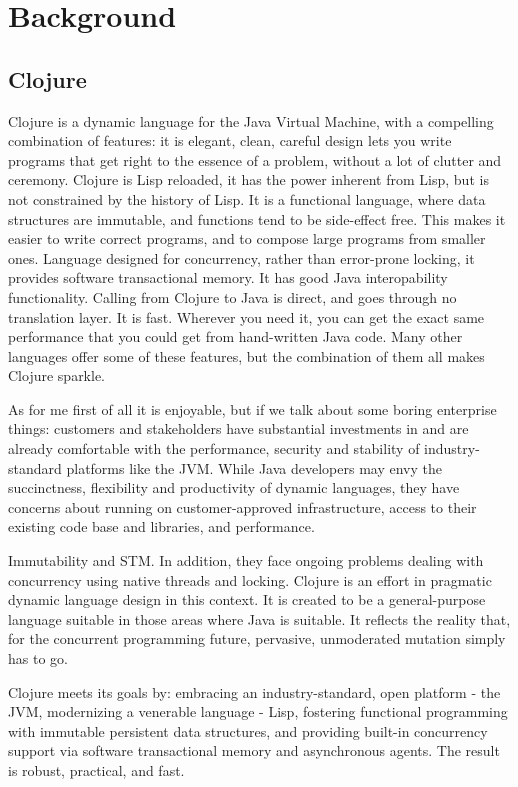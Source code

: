 \chapter{Background}
\label{chap:background}

\section{Clojure}

Clojure is a dynamic language for the Java Virtual Machine, with a compelling
combination of features: it is elegant, clean, careful design lets you write
programs that get right to the essence of a problem, without a lot of clutter
and ceremony. Clojure is Lisp reloaded, it has the power inherent from Lisp, but
is not constrained by the history of Lisp. It is a functional language, where
data structures are immutable, and functions tend to be side-effect free. This
makes it easier to write correct programs, and to compose large programs from
smaller ones. Language designed for concurrency, rather than error-prone
locking, it provides software transactional memory. It has good Java
interopability functionality. Calling from Clojure to Java is direct, and goes
through no translation layer. It is fast. Wherever you need it, you can get
the exact same performance that you could get from hand-written Java code. Many
other languages offer some of these features, but the combination of them all
makes Clojure sparkle.

As for me first of all it is enjoyable, but if we talk about some boring
enterprise things: customers and stakeholders have substantial investments in
and are already comfortable with the performance, security and stability of
industry-standard platforms like the JVM. While Java developers may envy the
succinctness, flexibility and productivity of dynamic languages, they have
concerns about running on customer-approved infrastructure, access to their
existing code base and libraries, and performance.

Immutability and STM. In addition, they face ongoing problems dealing with
concurrency using native threads and locking. Clojure is an effort in pragmatic
dynamic language design in this context. It is created to be a general-purpose
language suitable in those areas where Java is suitable. It reflects the reality
that, for the concurrent programming future, pervasive, unmoderated mutation
simply has to go.

Clojure meets its goals by: embracing an industry-standard, open platform - the
JVM, modernizing a venerable language - Lisp, fostering functional programming
with immutable persistent data structures, and providing built-in concurrency
support via software transactional memory and asynchronous agents. The result is
robust, practical, and fast.

